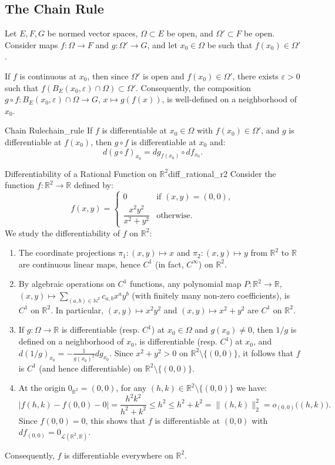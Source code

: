 \documentclass[11pt, a4paper]{article}
\newcommand{\R}{\mathbb{R}}
\newcommand{\N}{\mathbb{N}}
\newcommand{\eps}{\varepsilon}
\begin{document}
\subsection{The Chain Rule}
Let $E, F, G$ be normed vector spaces, $\Omega \subset E$ be open, and $\Omega' \subset F$ be open. Consider maps $f: \Omega \to F$ and $g: \Omega' \to G$, and let $x_0 \in \Omega$ be such that $f(x_0) \in \Omega'$.

If $f$ is continuous at $x_0$, then since $\Omega'$ is open and $f(x_0) \in \Omega'$, there exists $\eps > 0$ such that $f(B_E(x_0, \eps) \cap \Omega) \subset \Omega'$. Consequently, the composition $g \circ f: B_E(x_0, \eps) \cap \Omega \to G$, $x \mapsto g(f(x))$, is well-defined on a neighborhood of $x_0$.

\begin{proposition}{Chain Rule}{chain_rule}
If $f$ is differentiable at $x_0 \in \Omega$ with $f(x_0) \in \Omega'$, and $g$ is differentiable at $f(x_0)$, then $g \circ f$ is differentiable at $x_0$ and:
\[
d(g \circ f)_{x_0} = dg_{f(x_0)} \circ df_{x_0}.
\]
\end{proposition}

\begin{example}{Differentiability of a Rational Function on $\R^2$}{diff_rational_r2}
Consider the function $f: \R^2 \to \R$ defined by:
\[
f(x, y) = \begin{cases}
0 & \text{if } (x, y) = (0, 0), \\
\dfrac{x^2 y^2}{x^2 + y^2} & \text{otherwise.}
\end{cases}
\]
We study the differentiability of $f$ on $\R^2$:
\begin{enumerate}
    \item The coordinate projections $\pi_1: (x, y) \mapsto x$ and $\pi_2: (x, y) \mapsto y$ from $\R^2$ to $\R$ are continuous linear maps, hence $C^1$ (in fact, $C^\infty$) on $\R^2$.
    \item By algebraic operations on $C^1$ functions, any polynomial map $P: \R^2 \to \R$, $(x, y) \mapsto \sum_{(a, b) \in \N^2} c_{a,b} x^a y^b$ (with finitely many non-zero coefficients), is $C^1$ on $\R^2$. In particular, $(x, y) \mapsto x^2 y^2$ and $(x, y) \mapsto x^2 + y^2$ are $C^1$ on $\R^2$.
    \item If $g: \Omega \to \R$ is differentiable (resp. $C^1$) at $x_0 \in \Omega$ and $g(x_0) \neq 0$, then $1/g$ is defined on a neighborhood of $x_0$, is differentiable (resp. $C^1$) at $x_0$, and $d(1/g)_{x_0} = -\frac{1}{g(x_0)^2} dg_{x_0}$. Since $x^2 + y^2 > 0$ on $\R^2 \setminus \{(0, 0)\}$, it follows that $f$ is $C^1$ (and hence differentiable) on $\R^2 \setminus \{(0, 0)\}$.
    \item At the origin $0_{\R^2} = (0, 0)$, for any $(h, k) \in \R^2 \setminus \{(0, 0)\}$ we have:
    \[
    |f(h, k) - f(0, 0) - 0| = \frac{h^2 k^2}{h^2 + k^2} \le h^2 \le h^2 + k^2 = \|(h, k)\|_2^2 = o_{(0, 0)}\big((h, k)\big).
    \]
    Since $f(0, 0) = 0$, this shows that $f$ is differentiable at $(0, 0)$ with $df_{(0, 0)} = 0_{\mathcal{L}(\R^2, \R)}$.
\end{enumerate}
Consequently, $f$ is differentiable everywhere on $\R^2$.
\end{example}
\end{document}

